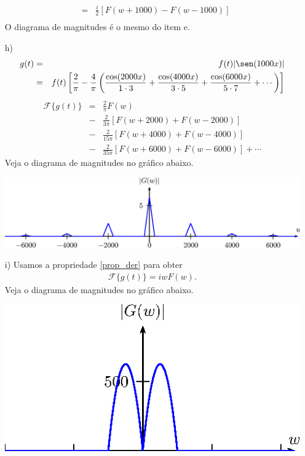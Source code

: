 \begin{resp}
\begin{itemize}
\begin{eqnarray*}
    &=&\frac{i}{2}\left[F(w+1000)-F(w-1000)\right]\\
    \end{eqnarray*}
    O diagrama de magnitudes é o mesmo do item e.
    \item[h)] 
    \begin{eqnarray*}g(t)&=&f(t)|\sen(1000x)|\\
        &=&f(t)\left[\frac{2}{\pi}-\frac{4}{\pi}\left(\frac{\cos(2000x)}{1\cdot 3}+\frac{\cos(4000x)}{3\cdot 5}+\frac{\cos(6000x)}{5\cdot 7}+\cdots\right)\right]
    \end{eqnarray*}
    \begin{eqnarray*}
    \mathcal{F}\{g(t)\}&=&\frac{2}{\pi}F(w)\\
    &-&\frac{2}{3\pi}\left[F(w+2000)+F(w-2000)\right]\\
    &-&\frac{2}{15\pi}\left[ F(w+4000)+F(w-4000)\right]\\
    &-&\frac{2}{35\pi}\left[ F(w+6000)+F(w-6000)\right]+\cdots
    \end{eqnarray*}
    Veja o diagrama de magnitudes no gráfico abaixo.
    \begin{center}
    \includegraphics{cap_propriedades_transformada/pics/figura_18}\end{center}
    \item[i)] Usamos a propriedade \ref{prop_der} para obter
    \begin{eqnarray*}
    \mathcal{F}\{g(t)\}=iwF(w).
    \end{eqnarray*}
    Veja o diagrama de magnitudes no gráfico abaixo.
    \begin{center}
    \includegraphics{cap_propriedades_transformada/pics/figura_19}\end{center}

\end{itemize}
\end{resp}
